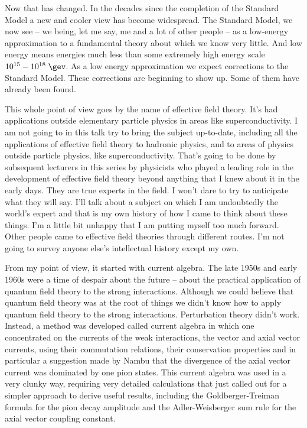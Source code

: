 Now that has changed. In the decades since the completion of the Standard Model a new and cooler view has become widespread. The Standard Model, we now see -- we being, let me say, me and a lot of other people -- as a low-energy approximation to a fundamental theory about which we know very little. And low energy means energies much less than some extremely high energy scale $10^{15}-10^{18}\;\gev$. As a low energy approximation we expect corrections to the Standard Model.  These corrections are beginning to show up. Some of them have already been found. 

This whole point of view goes by the name of effective field theory. It's had applications outside elementary particle physics in areas like superconductivity. I am not going to in this talk try to bring the subject up-to-date, including all the applications of effective field theory to hadronic physics, and to areas of physics outside particle physics, like superconductivity. That's going to be done by subsequent lecturers in this series by physicists who played a leading role in the development of effective field theory beyond anything that I knew about it in the early days. They are true experts in the field. I won't dare to try to anticipate what they will say. I'll talk about a subject on which I am undoubtedly the world's expert and that is my own history of how I came to think about these things. I'm a little bit unhappy that I am putting myself too much forward. Other people came to effective field theories through different routes. I'm not going to survey anyone else's intellectual history except my own.

From my point of view, it started with current algebra. The late 1950s and early 1960s were a time of despair about the future -- about the practical application of quantum field theory to the strong interactions. Although we could believe that quantum field theory  was at the root of things we didn't know how to apply quantum field theory to the strong interactions. Perturbation theory didn't work. Instead, a method was developed called current algebra in which one concentrated on the currents of the weak interactions, the vector and axial vector currents, using their commutation relations, their conservation properties and in particular a suggestion made by Nambu that the divergence of the axial vector current was dominated by one pion states. This current algebra was used in a very clunky way, requiring very detailed calculations that just called out for a simpler approach to derive useful results, including the Goldberger-Treiman formula for the pion decay amplitude and  the Adler-Weisberger sum rule  for the axial vector coupling constant. 

